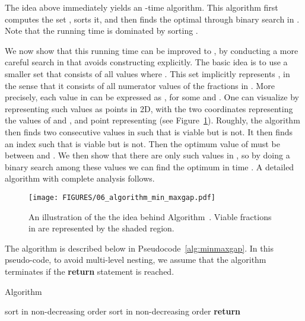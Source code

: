 The idea above immediately yields an -time algorithm. This algorithm
first computes the set , sorts it, and then finds the optimal 
through binary search in . Note that the running time is dominated by sorting . 

\smallskip

We now show that this running time can be improved to ,
by conducting a more careful search in  that avoids constructing  explicitly. 
The basic idea is to use a smaller set  that consists of all values  where .
This set  implicitly represents , in the sense that it consists of
all numerator values of the fractions in . More precisely,
each value in  can be expressed as , for some  and . 
One can visualize  by representing such values  as points in 2D, 
with the two coordinates representing the values of  and , and point  representing
 (see Figure~\ref{fig: idea behind algorithm minmaxgap}). 
Roughly, the algorithm then finds two consecutive values  in  such that
 is viable but  is not. It then finds an index  such that
 is viable but  is not. Then the optimum
value of  must be between  and . We then
show that there are only  such values in , so by doing a binary
search among these values we can find the optimum  in time . 
A detailed algorithm with complete analysis follows.

\begin{figure}[ht]
\centering
\texttt{[image: FIGURES/06\_algorithm\_min\_maxgap.pdf]} 
\caption{An illustration of the the idea behind Algorithm~.
Viable fractions in  are represented by the shaded region.
}
\label{fig: idea behind algorithm minmaxgap}
\end{figure}




\medskip

The algorithm is described below in Pseudocode~\ref{alg:minmaxgap}. In this pseudo-code,
to avoid multi-level nesting, we assume that the algorithm terminates if
the \textbf{return} statement is reached. 



\begin{algorithm}
  \caption{Algorithm~}
  \label{alg:minmaxgap}
  \begin{algorithmic}[1]
	\State {\myIf} {} {\myThen} {\myReturn} 
	\State 
	\State sort  in non-decreasing order
	\State {\myIf} {} {\myThen} {\myReturn} 
	\State 
	\State 
	\State {\myIf} {} {\myThen} {\myReturn} 
	\State 
	\State 		
	\State sort  in non-decreasing order
	\State \textbf{return} 
  \end{algorithmic}
\end{algorithm} 


